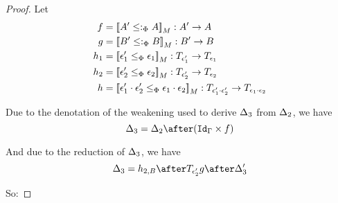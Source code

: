 \documentclass{Report}
\begin{document}
\begin{proof}
    Let \begin{align}
        f & = \deno{A' \subtypep A}: A' \rightarrow A\\
        g & = \deno{B' \subtypep B}: B' \rightarrow B\\
        h_1 & = \deno{\e_1' \subeffectp \e_1} : \T{\e_1'}{} \rightarrow \T{\e_1}{} \\
        h_2 & = \deno{\e_2'\subeffectp \e_2}:\T{\e_2'}{} \rightarrow \T{\e_2}{}\\
        h & = \deno{\e_1'\dot\e_2'\subeffectp\e_1\dot\e_2}: \T{\e_1'\dot\e_2'}{}\rightarrow \T{\e_1\dot\e_2}{}
    \end{align}

    Due to the denotation of the weakening used to derive $\Delta_3$ from $\Delta_2$, we have 
    \begin{equation}
        \D_3 = \D_2\after(\idg\times f)
    \end{equation}

    And due to the reduction of $\Delta_3$,
    we have 
    \begin{equation}
        \D_3 = h_{2, B} \after \T{\e_2'}{g}\after \D_3'
    \end{equation}

    So:


\end{proof}
\end{document}
